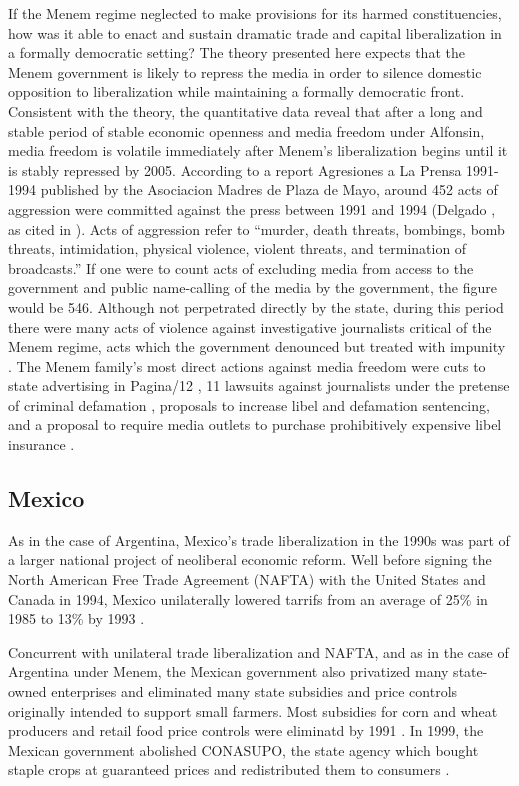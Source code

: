 \documentclass[12pt,a4paper]{article}\usepackage[]{graphicx}\usepackage[]{color}
\begin{document}
If the Menem regime neglected to make provisions for its harmed constituencies, how was it able to enact and sustain dramatic trade and capital liberalization in a formally democratic setting? The theory presented here expects that the Menem government is likely to repress the media in order to silence domestic opposition to liberalization while maintaining a formally democratic front. Consistent with the theory, the quantitative data reveal that after a long and stable period of stable economic openness and media freedom under Alfonsin, media freedom is volatile immediately after Menem's liberalization begins until it is stably repressed by 2005. According to a report Agresiones a La Prensa 1991-1994 published by the Asociacion Madres de Plaza de Mayo, around 452 acts of aggression were committed against the press between 1991 and 1994 (Delgado \cite*{Delgado:1995tr}, as cited in \cite[247]{Park:2002io}). Acts of aggression refer to “murder, death threats, bombings, bomb threats, intimidation, physical violence, violent threats, and termination of broadcasts.” If one were to count acts of excluding media from access to the government and public name-calling of the media by the government, the figure would be 546. Although not perpetrated directly by the state, during this period there were many acts of violence against investigative journalists critical of the Menem regime, acts which the government denounced but treated with impunity \parencite{Long:1993wb}. The Menem family's most direct actions against media freedom were cuts to state advertising in Pagina/12 \parencite[27]{Waisbord:1994kq}, 11 lawsuits against journalists under the pretense of criminal defamation \parencite{McCullough:1991cs}, proposals to increase libel and defamation sentencing, and a proposal to require media outlets to purchase prohibitively expensive libel insurance \parencite{Sims:kgMPqAHd}.

\subsection{Mexico}

As in the case of Argentina, Mexico's trade liberalization in the 1990s was part of a larger national project of neoliberal economic reform. Well before signing the North American Free Trade Agreement (NAFTA) with the United States and Canada in 1994, Mexico unilaterally lowered tarrifs from an average of 25\% in 1985 to 13\% by 1993 \parencite{McDaniel:2003kw}.

Concurrent with unilateral trade liberalization and NAFTA, and as in the case of Argentina under Menem, the Mexican government also privatized many state-owned enterprises and eliminated many state subsidies and price controls originally intended to support small farmers. Most subsidies for corn and wheat producers and retail food price controls were eliminatd by 1991 \parencite[295]{Hufbauer:2005vh}. In 1999, the Mexican government abolished CONASUPO, the state agency which bought staple crops at guaranteed prices and redistributed them to consumers \parencite[12]{Villareal:2010vk}.
\end{document}
